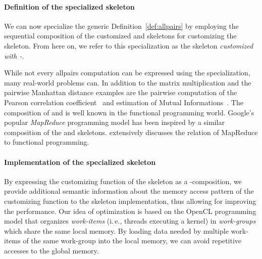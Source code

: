 \paragraph{Definition of the specialized \allpairs skeleton}

We can now specialize the generic Definition~\ref{def:allpairs} by employing the sequential composition of the customized \reduce and \zip skeletons for customizing the \allpairs skeleton.
From here on, we refer to this specialization as the \allpairs skeleton \emph{customized with \zip-\reduce}.


While not every allpairs computation can be expressed using the specialization, many real-world problems can.
In addition to the matrix multiplication and the pairwise Manhattan distance examples are the pairwise computation of the Pearson correlation coefficient~\cite{ChangDeQuRo2009} and estimation of Mutual Informations~\cite{DaubStSeKl2004}.
The composition of \zip and \reduce is well known in the functional programming world.
Google's popular \emph{MapReduce} programming model has been inspired by a similar composition of the \map and \reduce skeletons.
\cite{Laemmel2007} extensively discusses the relation of MapReduce to functional programming.


\paragraph{Implementation of the specialized \allpairs skeleton}
By expressing the customizing function of the \allpairs skeleton as a \zip-\reduce composition, we provide additional semantic information about the memory access pattern of the customizing function to the skeleton implementation, thus allowing for improving the performance.
Our idea of optimization is based on the OpenCL programming model that organizes \emph{work-items} (i.\,e., threads executing a kernel) in \emph{work-groups} which share the same \GPU local memory.
By loading data needed by multiple work-items of the same work-group into the local memory, we can avoid repetitive accesses to the global memory.

